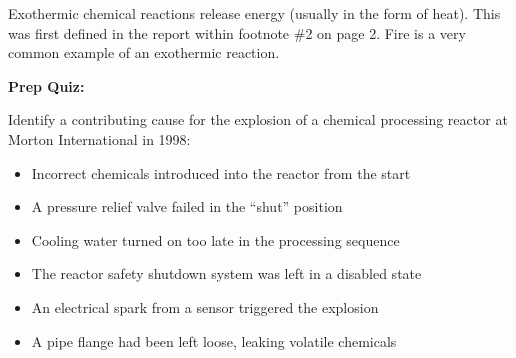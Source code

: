 Exothermic chemical reactions release energy (usually in the form of heat).  This was first defined in the report within footnote \#2 on page 2.  Fire is a very common example of an exothermic reaction.













\vfil \eject

\noindent
{\bf Prep Quiz:}

Identify a contributing cause for the explosion of a chemical processing reactor at Morton International in 1998:

\begin{itemize}
\item{} Incorrect chemicals introduced into the reactor from the start
\vskip 5pt 
\item{} A pressure relief valve failed in the ``shut'' position
\vskip 5pt 
\item{} Cooling water turned on too late in the processing sequence
\vskip 5pt 
\item{} The reactor safety shutdown system was left in a disabled state
\vskip 5pt 
\item{} An electrical spark from a sensor triggered the explosion
\vskip 5pt 
\item{} A pipe flange had been left loose, leaking volatile chemicals
\end{itemize}




